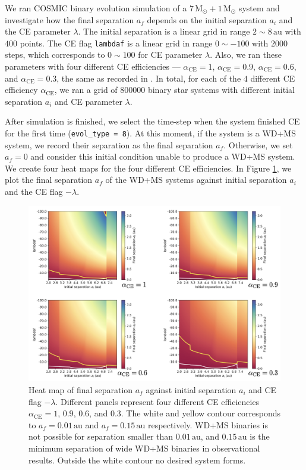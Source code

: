 \documentclass[12pt]{article}
\newcommand{\Msun}{\,\mathrm{M_{\odot}}}
\newcommand{\alphace}{\alpha_{\mathrm{CE}}}
\newcommand{\au}{\, \mathrm{au}}
\begin{document}
We ran COSMIC binary evolution simulation of a $7\Msun + 1\Msun$ system and investigate how the final separation $a_f$ depends on the initial separation $a_i$ and the CE parameter $\lambda$. The initial separation is a linear grid in range $2 \sim 8 \au$ with $400$ points. The CE flag \verb|lambdaf| is a linear grid in range $0 \sim -100$ with $2000$ steps, which corresponds to $0 \sim 100$ for CE parameter $\lambda$. Also, we ran these parameters with four different CE efficiencies — $\alphace = 1$, $\alphace = 0.9$, $\alphace = 0.6$, and $\alphace = 0.3$, the same as recorded in \cite{yamaguchi_hi}. In total, for each of the $4$ different CE efficiency $\alphace$, we ran a grid of $800000$ binary star systems with different initial separation $a_i$ and CE parameter $\lambda$.

After simulation is finished, we select the time-step when the system finished CE for the first time (\verb|evol_type = 8|). At this moment, if the system is a WD+MS system, we record their separation as the final separation $a_f$. Otherwise, we set $a_f = 0$ and consider this initial condition unable to produce a WD+MS system. We create four heat maps for the four different CE efficiencies. In Figure \ref{res_hi}, we plot the final separation $a_f$ of the WD+MS systems against initial separation $a_i$ and the CE flag $- \lambda$.

\begin{figure}
  \centering
  \includegraphics[width=\linewidth]{fig/7+1results.png}
  \caption{Heat map of final separation $a_f$ against initial separation $a_i$ and CE flag $-\lambda$. Different panels represent four different CE efficiencies $\alphace = 1$, $0.9$, $0.6$, and $0.3$. The white and yellow contour corresponds to $a_f = 0.01 \au$ and $a_f = 0.15 \au$ respectively. WD+MS binaries is not possible for separation smaller than $0.01 \au$, and $0.15 \au$ is the minimum separation of wide WD+MS binaries in observational results. Outside the white contour no desired system forms.}
  \label{res_hi}
\end{figure}
\end{document}
